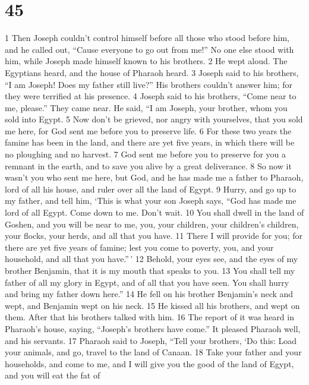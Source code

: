 \hypertarget{section-44}{%
\section{45}\label{section-44}}

{1} Then Joseph couldn't control himself before all those who stood
before him, and he called out, ``Cause everyone to go out from me!'' No
one else stood with him, while Joseph made himself known to his
brothers. {2} He wept aloud. The Egyptians heard, and the house of
Pharaoh heard. {3} Joseph said to his brothers, ``I am Joseph! Does my
father still live?'' His brothers couldn't answer him; for they were
terrified at his presence. {4} Joseph said to his brothers, ``Come near
to me, please.'' They came near. He said, ``I am Joseph, your brother,
whom you sold into Egypt. {5} Now don't be grieved, nor angry with
yourselves, that you sold me here, for God sent me before you to
preserve life. {6} For these two years the famine has been in the land,
and there are yet five years, in which there will be no ploughing and no
harvest. {7} God sent me before you to preserve for you a remnant in the
earth, and to save you alive by a great deliverance. {8} So now it
wasn't you who sent me here, but God, and he has made me a father to
Pharaoh, lord of all his house, and ruler over all the land of Egypt.
{9} Hurry, and go up to my father, and tell him, `This is what your son
Joseph says, ``God has made me lord of all Egypt. Come down to me. Don't
wait. {10} You shall dwell in the land of Goshen, and you will be near
to me, you, your children, your children's children, your flocks, your
herds, and all that you have. {11} There I will provide for you; for
there are yet five years of famine; lest you come to poverty, you, and
your household, and all that you have.''\,' {12} Behold, your eyes see,
and the eyes of my brother Benjamin, that it is my mouth that speaks to
you. {13} You shall tell my father of all my glory in Egypt, and of all
that you have seen. You shall hurry and bring my father down here.''
{14} He fell on his brother Benjamin's neck and wept, and Benjamin wept
on his neck. {15} He kissed all his brothers, and wept on them. After
that his brothers talked with him. {16} The report of it was heard in
Pharaoh's house, saying, ``Joseph's brothers have come.'' It pleased
Pharaoh well, and his servants. {17} Pharaoh said to Joseph, ``Tell your
brothers, `Do this: Load your animals, and go, travel to the land of
Canaan. {18} Take your father and your households, and come to me, and I
will give you the good of the land of Egypt, and you will eat the fat of
